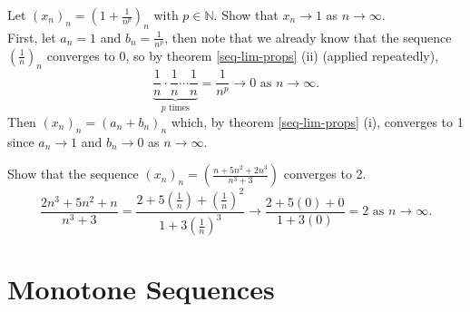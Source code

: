 \documentclass[../real_analysis.tex]{subfiles}
\begin{document}
        \begin{example}
            Let $(x_n)_n=\left(1+\frac{1}{n^p}\right)_n$ with $p\in\mathbb{N}$. Show that $x_n\to1$ as $n\to\infty$.\\
            First, let $a_n=1$ and $b_n=\frac{1}{n^p}$, then note that we already know that the sequence $\left(\frac{1}{n}\right)_n$ converges to 0, so by theorem \ref{seq-lim-props} (ii) (applied repeatedly),
            \begin{equation*}
                \underbrace{\frac{1}{n}\cdot\frac{1}{n}\cdots\frac{1}{n}}_{p\text{ times}}=\frac{1}{n^p}\to0\text{ as }n\to\infty.
            \end{equation*}
            Then $(x_n)_n=(a_n+b_n)_n$ which, by theorem \ref{seq-lim-props} (i), converges to 1 since $a_n\to1$ and $b_n\to0$ as $n\to\infty$.
        \end{example}
        \begin{example}
            Show that the sequence $(x_n)_n=\left(\frac{n+5n^2+2n^3}{n^3+3}\right)$ converges to 2.\\
            \begin{equation*}
                \frac{2n^3+5n^2+n}{n^3+3}=\frac{2+5\left(\frac{1}{n}\right)+\left(\frac{1}{n}\right)^2}{1+3\left(\frac{1}{n}\right)^3}\to\frac{2+5(0)+0}{1+3(0)}=2\text{ as }n\to\infty.
            \end{equation*}
        \end{example}

    \section{Monotone Sequences}
\end{document}
